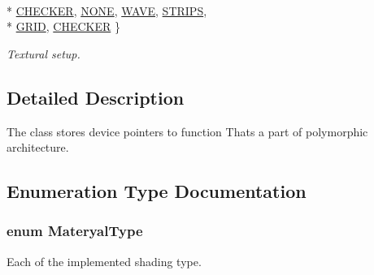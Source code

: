 \begin{DoxyCompactItemize}
\\*
\hyperlink{group__wrapping__and__description_ggadbd34cc71bd63d767b48ef9a2fc91c7bade60519f49c1d1276c2df9c2dc500297}{C\+H\+E\+C\+K\+ER}, 
\hyperlink{group__wrapping__and__description_ggadbd34cc71bd63d767b48ef9a2fc91c7bac157bdf0b85a40d2619cbc8bc1ae5fe2}{N\+O\+NE}, 
\hyperlink{group__wrapping__and__description_ggadbd34cc71bd63d767b48ef9a2fc91c7ba4025728e15f4cee76a85d2cc65ccb565}{W\+A\+VE}, 
\hyperlink{group__wrapping__and__description_ggadbd34cc71bd63d767b48ef9a2fc91c7ba7722877891b40e3f2d2b413d06067894}{S\+T\+R\+I\+PS}, 
\\*
\hyperlink{group__wrapping__and__description_ggadbd34cc71bd63d767b48ef9a2fc91c7bafbf4fa9eb81ba842a80a29b45064e348}{G\+R\+ID}, 
\hyperlink{group__wrapping__and__description_ggadbd34cc71bd63d767b48ef9a2fc91c7bade60519f49c1d1276c2df9c2dc500297}{C\+H\+E\+C\+K\+ER}
 \}\begin{DoxyCompactList}\small\item\em Textural setup. \end{DoxyCompactList}
\end{DoxyCompactItemize}


\subsection{Detailed Description}
The class stores device pointers to function That\textquotesingle{}s a part of polymorphic architecture. 



\subsection{Enumeration Type Documentation}
\subsubsection[{\texorpdfstring{Materyal\+Type}{MateryalType}}]{\setlength{\rightskip}{0pt plus 5cm}enum {\bf Materyal\+Type}}\hypertarget{group__wrapping__and__description_ga4415a3504a4255d8563ded7496546564}{}\label{group__wrapping__and__description_ga4415a3504a4255d8563ded7496546564}


Each of the implemented shading type. 

